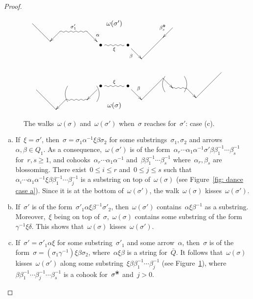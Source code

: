 \documentclass{memo-l}
\theoremstyle{definition}
\newcommand{\blossom}{^\text{\ding{96}}} %
\begin{document}
\begin{proof}
\begin{figure}[t]
\[
\xy
%
(-42,25)="-15";
(-33,16)="-14";
(-28,21)="-13";
(-14,21)="-12";
(-7,14)*+{\bullet}="-11";
(0,25)*+{\omega(\sigma')};
(7,14)*+{\bullet}="11";
(14,7)="12";
(25,18)="13";
(30,23)="14";
%
{\ar@{-} "-15";"-14"};
{\ar "-13";"-14"};
{\ar@{~}^{\sigma'_1} "-13";"-12"};
{\ar^\alpha "-12";"-11"};
{\ar@{~}_\xi "-11";"11"};
{\ar_\beta "11";"12"};
{\ar@{-} "12";"13"};
{\ar_{\beta_s\blossom} "14";"13"};
%
(-40,-9)="-5";
(-30,-19)="-4";
(-25,-14)="-3";
(-14,-14)="-2";
(-7,-7)*+{\bullet}="-1";
(0,-17)*+{\omega(\sigma)};
(7,-7)*+{\bullet}="1";
(14,-14)="2";
(25,-3)="3";
(30,-8)="4";
(37,-8)="5";
(42,-13)="6";
(55,0)="7";
%
{\ar@{-} "-5";"-4"};
{\ar "-3";"-4"};
{\ar@{~} "-3";"-2"};
{\ar "-1";"-2"};
{\ar@{~}^\xi "-1";"1"};
{\ar^\beta "1";"2"};
{\ar@{-} "2";"3"};
{\ar "3";"4"};
{\ar@{~} "4";"5"};
{\ar "5";"6"};
{\ar@{-} "6";"7"};
%
{\ar@/^.3pc/@{-} (-9,-7);(-9,-15)};
{\ar@/_.3pc/@{-} (-24,-7);(-24,-15)};
%
{\ar@/_.3pc/@{-} (26,-2);(26,-10)};
{\ar@/^.3pc/@{-} (36,-2);(36,-10)};
%
\endxy
\]
    \caption{The walks~$\omega(\sigma)$ and~$\omega(\sigma')$ when~$\sigma$ reaches for~$\sigma'$: case (c).}
    \label{fig: dance case c}
\end{figure}

\begin{enumerate}[(a)]
\item If~$\xi=\sigma'$, then~$\sigma = \sigma_1\alpha^{-1}\xi\beta\sigma_2$ for some substrings~$\sigma_1,\sigma_2$ and arrows~${\alpha,\beta\in Q_1}$.
As a consequence,~$\omega(\sigma')$ is of the form~$\alpha_r\cdots\alpha_1\alpha^{-1}\sigma'\beta\beta_1^{-1}\cdots\beta_s^{-1}$ for~${r,s\geq 1}$, and cohooks~$\alpha_r\cdots\alpha_1\alpha^{-1}$ and~$\beta\beta_1^{-1}\cdots\beta_s^{-1}$ where~$\alpha_r,\beta_s$ are blossoming.
There exist~$0\leq i\leq r$ and~$0\leq j\leq s$ such that~$\alpha_i\cdots\alpha_1\alpha^{-1}\xi\beta\beta_1^{-1}\cdots\beta_j^{-1}$ is a substring on top of~$\omega(\sigma)$ (see Figure~\ref{fig: dance case a}).
Since it is at the bottom of~$\omega(\sigma')$, the walk~$\omega(\sigma)$ kisses~$\omega(\sigma')$.

\item If~$\sigma'$ is of the form~$\sigma'_1\alpha\xi\beta^{-1}\sigma'_2$, then~$\omega(\sigma')$ contains~$\alpha\xi\beta^{-1}$ as a substring.
Moreover,~$\xi$ being on top of~$\sigma$,~$\omega(\sigma)$ contains some substring of the form~$\gamma^{-1}\xi\delta$.
This shows that~$\omega(\sigma)$ kisses~$\omega(\sigma')$.

\item If~$\sigma'=\sigma'_1\alpha\xi$ for some substring~$\sigma'_1$ and some arrow~$\alpha$, then~$\sigma$ is of the form~$\sigma=(\sigma_1\gamma^{-1})\xi\beta\sigma_2$, where~$\alpha\xi\beta$ is a string for~$\bar Q$.
It follows that~$\omega(\sigma)$ kisses~$\omega(\sigma')$ along some substring~$\xi\beta\beta_1^{-1}\cdots\beta_j^{-1}$ (see Figure~\ref{fig: dance case c}), where~$\beta\beta_1^{-1}\cdots\beta_j^{-1}\cdots\beta_s^{-1}$ is a cohook for~$\sigma\blossom$ and~${j>0}$.
\end{enumerate}


\end{proof}
\end{document}
